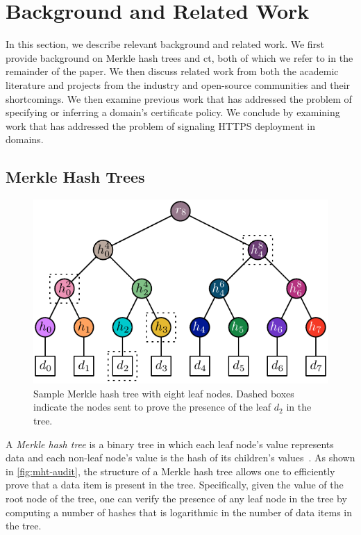 \section{Background and Related Work}
\label{sec:background}

In this section, we describe relevant background and related work. We first
provide background on Merkle hash trees and \acl{ct}, both of which we refer to
in the remainder of the paper. We then discuss related work from both the
academic literature and projects from the industry and open-source communities
and their shortcomings. We then examine previous work that has addressed the
problem of specifying or inferring a domain's certificate policy. We conclude by
examining work that has addressed the problem of signaling HTTPS deployment in
domains.

\subsection{Merkle Hash Trees}
\label{sec:background:mht}

\begin{figure}
  \centering
  \includegraphics[width=\linewidth]{fig/mht-audit}
  \caption{Sample Merkle hash tree with eight leaf nodes. Dashed boxes indicate
  the nodes sent to prove the presence of the leaf $d_2$ in the tree.}
  \label{fig:mht-audit}
\end{figure}

A \emph{Merkle hash tree} is a binary tree in which each leaf node's value
represents data and each non-leaf node's value is the hash of its children's
values~\cite{merkle1988digital}. As shown in \autoref{fig:mht-audit}, the
structure of a Merkle hash tree allows one to efficiently prove that a data item
is present in the tree. Specifically, given the value of the root node of the
tree, one can verify the presence of any leaf node in the tree by computing a
number of hashes that is logarithmic in the number of data items in the tree.

